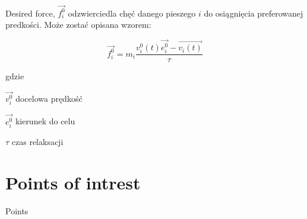 Desired force, $\vec{f_{i}^{0}}$ odzwierciedla chęć danego pieszego $i$ do osiągnięcia preferowanej predkości. Może zostać opisana wzorem:

\begin{equation}
\vec{f_{i}^{0}} = m_{i} \frac{v_{i}^{0}(t) \vec{e_{i}^{0}} - \vec{v_{i}(t)}}{\tau}
\end{equation}

gdzie
\begin{eqwhere}[2cm]
	\item[$\vec{v_{i}^{0}}$] docelowa prędkość
	\item[$\vec{e_{i}^{0}}$] kierunek do celu
	\item[$\tau$] czas relaksacji
\end{eqwhere}

\section{Points of intrest}
\label{sec:pointsOfInterest}
 Points
